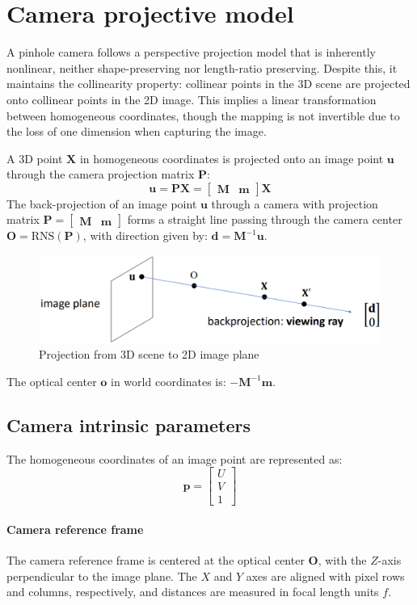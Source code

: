 \section{Camera projective model}

A pinhole camera follows a perspective projection model that is inherently nonlinear, neither shape-preserving nor length-ratio preserving.
Despite this, it maintains the collinearity property: collinear points in the 3D scene are projected onto collinear points in the 2D image.
This implies a linear transformation between homogeneous coordinates, though the mapping is not invertible due to the loss of one dimension when capturing the image.

A 3D point $\mathbf{X}$ in homogeneous coordinates is projected onto an image point $\mathbf{u}$ through the camera projection matrix $\mathbf{P}$:
\[\mathbf{u}=\mathbf{PX}=\begin{bmatrix} \mathbf{M} & \mathbf{m} \end{bmatrix}\mathbf{X}\]
The back-projection of an image point $\mathbf{u}$ through a camera with projection matrix $\mathbf{P}=\begin{bmatrix} \mathbf{M} & \mathbf{m} \end{bmatrix}$ forms a straight line passing through the camera center $\mathbf{O}=\text{RNS}(\mathbf{P})$, with direction given by: $\mathbf{d}=\mathbf{M}^{-1}\mathbf{u}$.
\begin{figure}[H]
    \centering
    \includegraphics[width=0.6\linewidth]{images/scene.png}
    \caption{Projection from 3D scene to 2D image plane}
\end{figure}
The optical center $\mathbf{o}$ in world coordinates is: $-\mathbf{M}^{-1}\mathbf{m}$.

\subsection{Camera intrinsic parameters}
The homogeneous coordinates of an image point are represented as:
\[\mathbf{p} = \begin{bmatrix} U \\ V \\ 1 \end{bmatrix}\]

\paragraph*{Camera reference frame}
The camera reference frame is centered at the optical center $\mathbf{O}$, with the $Z$-axis perpendicular to the image plane.
The $X$ and $Y$ axes are aligned with pixel rows and columns, respectively, and distances are measured in focal length units $f$.

